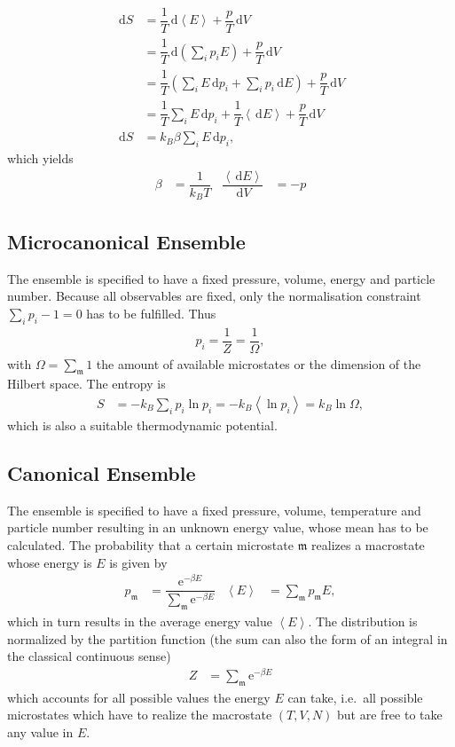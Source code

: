\documentclass[a4paper,10pt]{article}
\newcommand{\td}{\,\text{d}}
\numberwithin{equation}{section}
\begin{document}
\begin{multicols}{2}
\begin{align}
  \td S &= \dfrac{1}{T}\td \left\langle E\right\rangle  + \dfrac{p}{T}\td V\\
        &= \dfrac{1}{T}\td \left(\sum_{i}^{}p_iE\right) + \dfrac{p}{T}\td V\\
        &= \dfrac{1}{T}\left(\sum_{i}^{}E\td p_i + \sum_{i}^{}p_i\td E\right) + \dfrac{p}{T}\td V\\
        &= \dfrac{1}{T}\sum_{i}^{}E\td p_i + \dfrac{1}{T}\left\langle \td E\right\rangle +\dfrac{p}{T}\td V\\
  \td S &= k_B\beta \sum_{i}^{}E\td p_i
,\end{align} 
which yields
\begin{align} 
  \beta  &= \dfrac{1}{k_BT} & \dfrac{\left\langle \td E\right\rangle }{\td V} &= -p
\end{align} 

\subsection{Microcanonical Ensemble}
The ensemble is specified to have a fixed pressure, volume, energy and particle number.
Because all observables are fixed, only the normalisation constraint $\sum_{i}^{}p_i-1=0$ has to be fulfilled.
Thus
\begin{align} 
  p_i=\dfrac{1}{Z}=\dfrac{1}{\Omega }
,\end{align} 
with $\Omega =\sum_{\mathfrak{m}}^{}1$ the amount of available microstates or the dimension of the Hilbert space.
The entropy is
\begin{align} 
  S &= -k_B\sum_{i}^{}p_i\ln p_i=-k_B\left\langle \ln p_i\right\rangle =k_B\ln \Omega 
,\end{align} 
which is also a suitable thermodynamic potential.

\subsection{Canonical Ensemble}
The ensemble is specified to have a fixed pressure, volume, temperature and particle number resulting in an unknown energy value, whose mean has to be calculated.
The probability that a certain microstate $\mathfrak{m}$ realizes a macrostate whose energy is $E$ is given by
\begin{align} 
  p_\mathfrak{m} &= \dfrac{\text{e}^{-\beta E}}{\sum_{\mathfrak{m}}^{}\text{e}^{-\beta E}} & \left\langle E\right\rangle &=\sum_{\mathfrak{m}}^{}p_\mathfrak{m}E
,\end{align} 
which in turn results in the average energy value $\left\langle E\right\rangle $.
The distribution is normalized by the partition function (the sum can also the form of an integral in the classical continuous sense)
\begin{align} 
  Z &= \sum_{\mathfrak{m}}^{}\text{e}^{-\beta E}
\end{align} 
which accounts for all possible values the energy $E$ can take, i.e.\ all possible microstates which have to realize the macrostate $\left(T,V,N\right)$ but are free to take any value in $E$.


\end{multicols}
\end{document}
